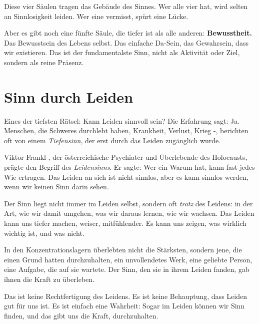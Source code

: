 Diese vier Säulen tragen das Gebäude des Sinnes. Wer alle vier hat, wird selten an Sinnlosigkeit leiden. Wer eine vermisst, spürt eine Lücke.

Aber es gibt noch eine fünfte Säule, die tiefer ist als alle anderen: \textbf{Bewusstheit.} Das Bewusstsein des Lebens selbst. Das einfache Da-Sein, das Gewahrsein, dass wir existieren. Das ist der fundamentalste Sinn, nicht als Aktivität oder Ziel, sondern als reine Präsenz.

\section{Sinn durch Leiden}

Eines der tiefsten Rätsel: Kann Leiden sinnvoll sein? Die Erfahrung sagt: Ja. Menschen, die Schweres durchlebt haben, Krankheit, Verlust, Krieg -, berichten oft von einem \emph{Tiefensinn}, der erst durch das Leiden zugänglich wurde.

Viktor Frankl \cite{Frankl1946}, der österreichische Psychiater und Überlebende des Holocausts, prägte den Begriff des \emph{Leidensinns}. Er sagte: \glqq Wer ein Warum hat, kann fast jedes Wie ertragen.\grqq{} Das Leiden an sich ist nicht sinnlos, aber es kann sinnlos werden, wenn wir keinen Sinn darin sehen.

Der Sinn liegt nicht immer im Leiden selbst, sondern oft \emph{trotz} des Leidens: in der Art, wie wir damit umgehen, was wir daraus lernen, wie wir wachsen. Das Leiden kann uns tiefer machen, weiser, mitfühlender. Es kann uns zeigen, was wirklich wichtig ist, und was nicht.

\begin{bsp}
	In den Konzentrationslagern überlebten nicht die Stärksten, sondern jene, die einen Grund hatten durchzuhalten, ein unvollendetes Werk, eine geliebte Person, eine Aufgabe, die auf sie wartete. Der Sinn, den sie in ihrem Leiden fanden, gab ihnen die Kraft zu überleben.
\end{bsp}

Das ist keine Rechtfertigung des Leidens. Es ist keine Behauptung, dass Leiden \glqq gut\grqq{} für uns ist. Es ist einfach eine Wahrheit: Sogar im Leiden können wir Sinn finden, und das gibt uns die Kraft, durchzuhalten.

